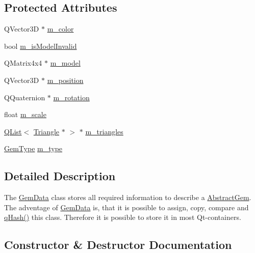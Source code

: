 \subsection*{Protected Attributes}
\begin{DoxyCompactItemize}
\item 
Q\+Vector3\+D $\ast$ \hyperlink{class_gem_data_aa5888d4d3212ba621643a0f1c1efca76}{m\+\_\+color}
\item 
bool \hyperlink{class_gem_data_a82ba26b9a691149c8525244969cceaef}{m\+\_\+is\+Model\+Invalid}
\item 
Q\+Matrix4x4 $\ast$ \hyperlink{class_gem_data_a3a7eec529b0228a410ea608401cf2f1a}{m\+\_\+model}
\item 
Q\+Vector3\+D $\ast$ \hyperlink{class_gem_data_ad5c2bc9fc38c168fbbf143e0092c8cdb}{m\+\_\+position}
\item 
Q\+Quaternion $\ast$ \hyperlink{class_gem_data_a8a055b766496fa47842a683035f15637}{m\+\_\+rotation}
\item 
float \hyperlink{class_gem_data_a15953642fe15a2a37aceea037e4ad81e}{m\+\_\+scale}
\item 
\hyperlink{class_q_list}{Q\+List}$<$ \hyperlink{class_triangle}{Triangle} $\ast$ $>$ $\ast$ \hyperlink{class_gem_data_a21068b04db70d2e37e9c30d816484f25}{m\+\_\+triangles}
\item 
\hyperlink{abstractgem_8h_a2f0a34b6dac35a9610cab7a1c5fcb444}{Gem\+Type} \hyperlink{class_gem_data_a310940114f54b2146f6601662e8a323f}{m\+\_\+type}
\end{DoxyCompactItemize}


\subsection{Detailed Description}
The \hyperlink{class_gem_data}{Gem\+Data} class stores all required information to describe a \hyperlink{class_abstract_gem}{Abstract\+Gem}.  The adventage of \hyperlink{class_gem_data}{Gem\+Data} is, that it is possible to assign, copy, compare and \hyperlink{abstractgem_8cpp_a92fb5a3a6f53f07f0f9653dd299d31ff}{q\+Hash()} this class. Therefore it is possible to store it in most Qt-\/containers. 

\subsection{Constructor \& Destructor Documentation}
\hypertarget{class_gem_data_a1140e4a3ecf37d05cddf303d7a120ca1}{}
